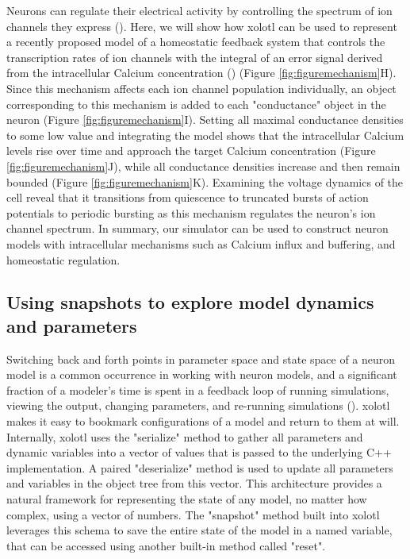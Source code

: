 \documentclass{frontiersSCNS} %
\begin{document}
Neurons can regulate their electrical activity by controlling the spectrum of ion channels they express (\cite{macleanActivityIndependentHomeostasisRhythmically2003, turrigianoSelectiveRegulationCurrent1995, schulzVariableChannelExpression2006}). Here, we will show how xolotl can be used to represent a recently proposed model of a homeostatic feedback system that controls the transcription rates of ion channels with the integral of an error signal derived from the intracellular Calcium concentration (\cite{olearyCorrelationsIonChannel2013, olearyCellTypesNetwork2014}) (Figure \ref{fig:figuremechanism}H). Since this mechanism affects each ion channel population individually, an object corresponding to this mechanism is added to each "conductance" object in the neuron (Figure \ref{fig:figuremechanism}I). Setting all maximal conductance densities to some low value and integrating the model shows that the intracellular Calcium levels rise over time and approach the target Calcium concentration (Figure \ref{fig:figuremechanism}J), while all conductance densities increase and then remain bounded (Figure \ref{fig:figuremechanism}K). Examining the voltage dynamics of the cell reveal that it transitions from quiescence to truncated bursts of action potentials to periodic bursting as this mechanism regulates the neuron's ion channel spectrum. In summary, our simulator can be used to construct neuron models with intracellular mechanisms such as Calcium influx and buffering, and homeostatic regulation.  




%
%
%
%
%




\subsection{Using snapshots to explore model dynamics and parameters}

Switching back and forth points in parameter space and state space of a neuron model is a common occurrence in working with neuron models, and a significant fraction of a modeler's time is spent in a feedback loop of running simulations, viewing the output, changing parameters, and re-running simulations (\cite{deschutterConsumerGuideNeuronal1992}). xolotl makes it easy to bookmark configurations of a model and return to them at will. Internally, xolotl uses the "serialize" method to gather all parameters and dynamic variables into a vector of values that is passed to the underlying C++ implementation. A paired "deserialize" method is used to update all parameters and variables in the object tree from this vector. This architecture provides a natural framework for representing the state of any model, no matter how complex, using a vector of numbers. The "snapshot" method built into xolotl leverages this schema to save the entire state of the model in a named variable, that can be accessed using another built-in method called "reset".
\end{document}

